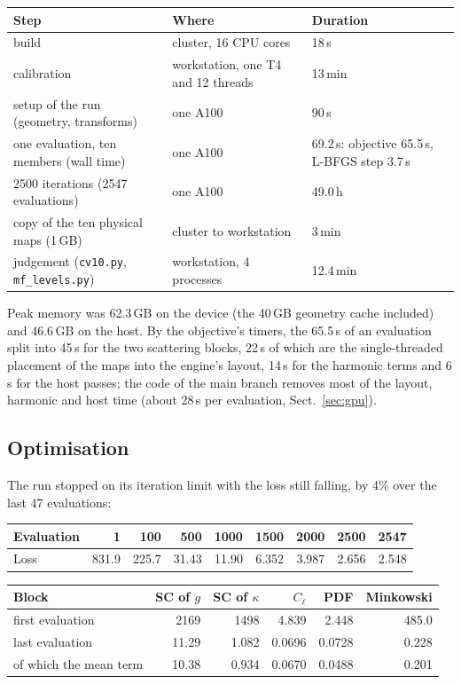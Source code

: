 \documentclass{aa}
\begin{document}
\begin{center}\small
\begin{tabular}{lll}
\hline\hline
Step & Where & Duration \\
\hline
build & cluster, 16 CPU cores & 18\,s \\
calibration & workstation, one T4 and 12 threads & 13\,min \\
setup of the run (geometry, transforms) & one A100 & 90\,s \\
one evaluation, ten members (wall time) & one A100 & 69.2\,s: objective 65.5\,s, L-BFGS step 3.7\,s \\
2500 iterations (2547 evaluations) & one A100 & 49.0\,h \\
copy of the ten physical maps (1\,GB) & cluster to workstation & 3\,min \\
judgement (\texttt{cv10.py}, \texttt{mf\_levels.py}) & workstation, 4 processes & 12.4\,min \\
\hline
\end{tabular}
\end{center}

Peak memory was 62.3\,GB on the device (the 40\,GB geometry cache included) and 46.6\,GB on the host. By the objective's timers, the 65.5\,s of an evaluation split into 45\,s for the two scattering blocks, 22\,s of which are the single-threaded placement of the maps into the engine's layout, 14\,s for the harmonic terms and 6\,s for the host passes; the code of the main branch removes most of the layout, harmonic and host time (about 28\,s per evaluation, Sect.~\ref{sec:gpu}).

\subsection{Optimisation}

The run stopped on its iteration limit with the loss still falling, by 4\% over the last 47 evaluations:

\begin{center}\small
\begin{tabular}{lrrrrrrrr}
\hline\hline
Evaluation & 1 & 100 & 500 & 1000 & 1500 & 2000 & 2500 & 2547 \\
\hline
Loss & 831.9 & 225.7 & 31.43 & 11.90 & 6.352 & 3.987 & 2.656 & 2.548 \\
\hline
\end{tabular}

\medskip
\begin{tabular}{lrrrrr}
\hline\hline
Block & SC of $g$ & SC of $\kappa$ & $C_\ell$ & PDF & Minkowski \\
\hline
first evaluation & 2169 & 1498 & 4.839 & 2.448 & 485.0 \\
last evaluation & 11.29 & 1.082 & 0.0696 & 0.0728 & 0.228 \\
of which the mean term & 10.38 & 0.934 & 0.0670 & 0.0488 & 0.201 \\
\hline
\end{tabular}
\end{center}
\end{document}
